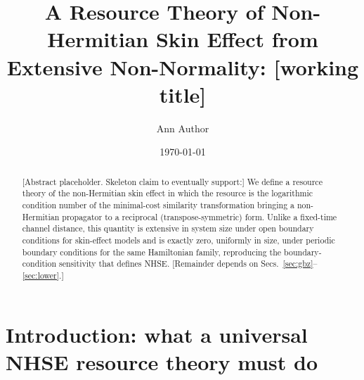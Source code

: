 \newcommand{\Tr}{\operatorname{Tr}}
\newcommand{\id}{\mathbbm{1}}
\newcommand{\GBZ}{\mathrm{GBZ}}
\newcommand{\NHSE}{\mathrm{NHSE}}
\newcommand{\diag}{\operatorname{diag}}
\newcommand{\norm}[1]{\left\lVert #1\right\rVert}
\newcommand{\spr}{\operatorname{spr}}
\newcommand{\cond}{\operatorname{cond}}
\newcommand{\Rres}{\mathcal R}
\newcommand{\Free}{\mathfrak F}
\newcommand{\GaugeC}{\mathfrak G}



\title{%
A Resource Theory of Non-Hermitian Skin Effect from Extensive
Non-Normality: [working title]
}

\author{Ann Author}
\date{\today}

\begin{abstract}
[Abstract placeholder. Skeleton claim to eventually support:] We
define a resource theory of the non-Hermitian skin effect in which
the resource is the logarithmic condition number of the minimal-cost
similarity transformation bringing a non-Hermitian propagator to a
reciprocal (transpose-symmetric) form. Unlike a fixed-time channel
distance, this quantity is extensive in system size under open
boundary conditions for skin-effect models and is exactly zero,
uniformly in size, under periodic boundary conditions for the same
Hamiltonian family, reproducing the boundary-condition sensitivity
that defines NHSE. [Remainder depends on
Secs.~\ref{sec:gbz}--\ref{sec:lower}.]
\end{abstract}

\maketitle

\section{Introduction: what a universal NHSE resource theory must do}
\label{sec:intro}

